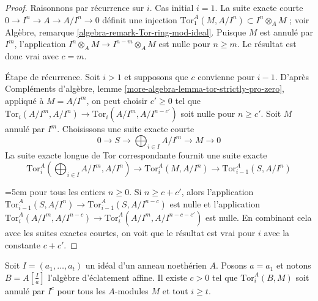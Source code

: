 \begin{proof}
Raisonnons par récurrence sur $i$. Cas initial $i = 1$. La suite exacte courte $0 \to I^n \to A \to A/I^n \to 0$ définit une injection $\text{Tor}_1^A(M, A/I^n) \subset I^n \otimes_A M$ ; voir Algèbre, remarque \ref{algebra-remark-Tor-ring-mod-ideal}. Puisque $M$ est annulé par $I^m$, l'application $I^n \otimes_A M \to I^{n - m} \otimes_A M$ est nulle pour $n \geq m$. Le résultat est donc vrai avec $c = m$.

\medskip\noindent
Étape de récurrence. Soit $i > 1$ et supposons que $c$ convienne pour $i - 1$. D'après Compléments d'algèbre, lemme \ref{more-algebra-lemma-tor-strictly-pro-zero}, appliqué à $M = A/I^m$, on peut choisir $c' \geq 0$ tel que $\text{Tor}_i(A/I^m, A/I^n) \to \text{Tor}_i(A/I^m, A/I^{n - c'})$ soit nulle pour $n \geq c'$. Soit $M$ annulé par $I^m$. Choisissons une suite exacte courte
$$
0 \to S \to \bigoplus\nolimits_{i \in I} A/I^m \to M \to 0
$$
La suite exacte longue de Tor correspondante fournit une suite exacte
$$
\text{Tor}_i^A(\bigoplus\nolimits_{i \in I} A/I^m, A/I^n) \to
\text{Tor}_i^A(M, A/I^n) \to
\text{Tor}_{i - 1}^A(S, A/I^n)
$$
{\emergencystretch=5em
pour tous les entiers $n \geq 0$. Si $n \geq c + c'$, alors l'application $\text{Tor}_{i - 1}^A(S, A/I^n) \to \text{Tor}_{i - 1}^A(S, A/I^{n - c})$ est nulle et l'application $\text{Tor}_i^A(A/I^m, A/I^{n - c}) \to 
\text{Tor}_i^A(A/I^m, A/I^{n - c - c'})$ est nulle. En combinant cela avec les suites exactes courtes, on voit que le résultat est vrai pour $i$ avec la constante $c + c'$.
\par}
\end{proof}

\begin{lemma}
\label{lemma-annihilates-affine}
Soit $I = (a_1, \ldots, a_t)$ un idéal d'un anneau noethérien $A$. Posons $a = a_1$ et notons $B = A[\frac{I}{a}]$ l'algèbre d'éclatement affine. Il existe $c > 0$ tel que $\text{Tor}_i^A(B, M)$ soit annulé par $I^c$ pour tous les $A$-modules $M$ et tout $i \geq t$.
\end{lemma}


